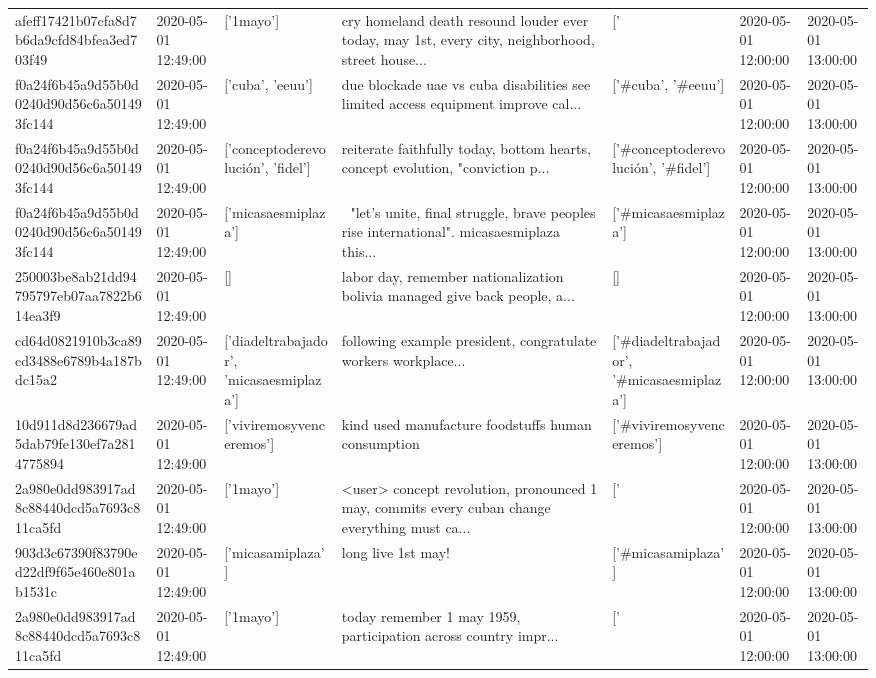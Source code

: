 \begin{tabular}{lllllll}
afeff17421b07cfa8d7b6da9cfd84bfea3ed703f49 & 2020-05-01 12:49:00 & ['1mayo'] & cry homeland death resound louder ever today, may 1st, every city, neighborhood, street house... & ['#1mayo'] & 2020-05-01 12:00:00 & 2020-05-01 13:00:00 \\
f0a24f6b45a9d55b0d0240d90d56c6a501493fc144 & 2020-05-01 12:49:00 & ['cuba', 'eeuu'] & due blockade uae vs cuba disabilities see limited access equipment improve cal... & ['#cuba', '#eeuu'] & 2020-05-01 12:00:00 & 2020-05-01 13:00:00 \\
f0a24f6b45a9d55b0d0240d90d56c6a501493fc144 & 2020-05-01 12:49:00 & ['conceptoderevolución', 'fidel'] & reiterate faithfully today, bottom hearts, concept evolution, "conviction p... & ['#conceptoderevolución', '#fidel'] & 2020-05-01 12:00:00 & 2020-05-01 13:00:00 \\
f0a24f6b45a9d55b0d0240d90d56c6a501493fc144 & 2020-05-01 12:49:00 & ['micasaesmiplaza'] & 🎵 "let's unite, final struggle, brave peoples rise international". micasaesmiplaza this... & ['#micasaesmiplaza'] & 2020-05-01 12:00:00 & 2020-05-01 13:00:00 \\
250003be8ab21dd94795797eb07aa7822b614ea3f9 & 2020-05-01 12:49:00 & [] & labor day, remember nationalization bolivia managed give back people, a... & [] & 2020-05-01 12:00:00 & 2020-05-01 13:00:00 \\
cd64d0821910b3ca89cd3488e6789b4a187bdc15a2 & 2020-05-01 12:49:00 & ['diadeltrabajador', 'micasaesmiplaza'] & following example president, congratulate workers workplace... & ['#diadeltrabajador', '#micasaesmiplaza'] & 2020-05-01 12:00:00 & 2020-05-01 13:00:00 \\
10d911d8d236679ad5dab79fe130ef7a2814775894 & 2020-05-01 12:49:00 & ['viviremosyvenceremos'] & kind used manufacture foodstuffs human consumption & ['#viviremosyvenceremos'] & 2020-05-01 12:00:00 & 2020-05-01 13:00:00 \\
2a980e0dd983917ad8c88440dcd5a7693c811ca5fd & 2020-05-01 12:49:00 & ['1mayo'] & <user> concept revolution, pronounced 1 may, commits every cuban change everything must ca... & ['#1mayo'] & 2020-05-01 12:00:00 & 2020-05-01 13:00:00 \\
903d3c67390f83790ed22df9f65e460e801ab1531c & 2020-05-01 12:49:00 & ['micasamiplaza'] & long live 1st may! & ['#micasamiplaza'] & 2020-05-01 12:00:00 & 2020-05-01 13:00:00 \\
2a980e0dd983917ad8c88440dcd5a7693c811ca5fd & 2020-05-01 12:49:00 & ['1mayo'] & today remember 1 may 1959, participation across country impr... & ['#1mayo'] & 2020-05-01 12:00:00 & 2020-05-01 13:00:00 \\

\end{tabular}
